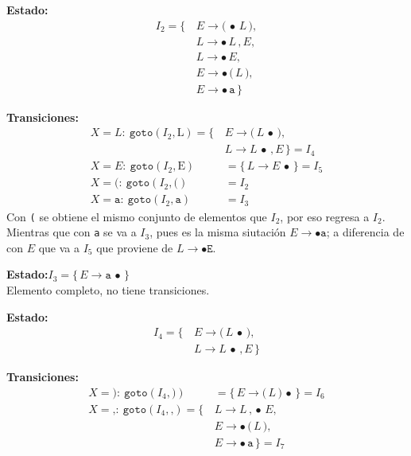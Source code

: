 \documentclass[12pt,letterpaper]{article}
\newcommand{\nt}[1]{\textit{#1}}
\newcommand{\tk}[1]{\texttt{#1}}
\newcommand{\tx}[1]{\text{#1}}
\begin{document}
\begin{enumerate}[label=\arabic*.]
  \medskip

  \textbf{Estado:}
  \[
  \begin{aligned}
    I_2 = \{\, & \nt{E}\to\tk{(}\,\bullet\,\nt{L}\,\tk{)},\\
               & \nt{L}\to\bullet\,\nt{L}\,\tk{,}\,\nt{E},\\
               & \nt{L}\to\bullet\,\nt{E},\\
               & \nt{E}\to\bullet\,\tk{(}\,\nt{L}\,\tk{)},\\
               & \nt{E}\to\bullet\,\tk{a}\,\}
  \end{aligned}
  \]
  
  \textbf{Transiciones:}
  \[
  \begin{aligned}
    X=\nt{L}:\ \texttt{goto}(I_2,\tx{L}) = \{\, & \nt{E}\to\tk{(}\,\nt{L}\,\bullet\,\tk{)},\\
                                              & \nt{L}\to\nt{L}\,\bullet\,\tk{,}\,\nt{E}\,\} = \boxed{I_4}\\[6pt]
    X=\nt{E}:\ \texttt{goto}(I_2,\tx{E}) &= \{\,\nt{L}\to\nt{E}\,\bullet\,\} = \boxed{I_5}\\[3pt]
    X=\tk{(}:\ \texttt{goto}(I_2,\tk{(}) &= I_2\\[3pt]
    X=\tk{a}:\ \texttt{goto}(I_2,\tk{a}) &= I_3
  \end{aligned}
  \]
  Con \tk{(} se obtiene el mismo conjunto de elementos que $I_2$, por eso regresa a $I_2$. Mientras que con
  \tk{a} se va a $I_3$, pues es la misma siutación $\nt{E}\to\bullet\tk{a}$; a diferencia de con $\nt{E}$ que va
  a $I_5$ que proviene de $\nt{L}\to\bullet\tk{E}$.

  \medskip

  \textbf{Estado:}\quad $I_3 = \{\,\nt{E}\to\tk{a}\,\bullet\,\}$\\
  Elemento completo, no tiene transiciones.

  \medskip

  \textbf{Estado:}
  \[
  \begin{aligned}
    I_4 = \{\, & \nt{E}\to\tk{(}\,\nt{L}\,\bullet\,\tk{)},\\
               & \nt{L}\to\nt{L}\,\bullet\,\tk{,}\,\nt{E}\,\}
  \end{aligned}
  \]

  \textbf{Transiciones:}
  \[
  \begin{aligned}
    X=\tk{)}:\ \texttt{goto}(I_4,\tk{)}) &= \{\,\nt{E}\to\tk{(}\,\nt{L}\,\tk{)}\,\bullet\,\} = \boxed{I_6}\\[6pt]
    X=\tk{,}:\ \texttt{goto}(I_4,\tk{,}) = \{\, & \nt{L}\to\nt{L}\,\tk{,}\,\bullet\,\nt{E},\\
                                              & \nt{E}\to\bullet\,\tk{(}\,\nt{L}\,\tk{)},\\
                                              & \nt{E}\to\bullet\,\tk{a}\,\} = \boxed{I_7}
  \end{aligned}
  \]


\end{enumerate}
\end{document}
